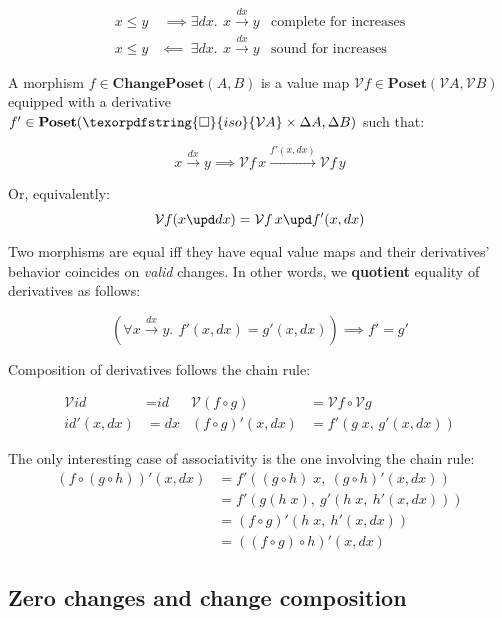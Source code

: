 \documentclass[nomarginums]{rntz}
\newcommand\cat\textbf
\newcommand\strong\textbf
\newcommand\CP{\cat{ChangePoset}}
\newcommand\Poset{\cat{Poset}}
\newcommand\D\Delta
\newcommand\x\times
\newcommand\iso{\texorpdfstring{\ensuremath{\square}}{iso}}
\newcommand\isof[1]{\iso {#1}}
\newcommand\fname[1]{\textit{#1}}
\newcommand\id{\fname{id}}
\newcommand\validarrow{{\to}}
\newcommand\longvalidarrow{{\longrightarrow}}
\newcommand\valid[1]{\mathrel{\overset{#1}{\validarrow}}}
\newcommand\longvalid[1]{\mathrel{\overset{#1}{\longvalidarrow}}}
\newcommand\vals[1]{#1^v} %
\newcommand\chgs[1]{\D{#1}}
\renewcommand\vals{\mathcal{V}}
\newcommand\funct[1]{\vals{#1}}
\newcommand\deriv[1]{#1'}
\newcommand\bindsp{~\,}
\newcommand\fa[1]{\forall #1.\bindsp}
\newcommand\ex[1]{\exists #1.\bindsp}
\begin{document}
\begin{align*}
  x \le y &~\implies \ex{dx} x \valid{dx} y
  & \text{complete for increases}\\
  x \le y &\impliedby~ \ex{dx} x \valid{dx} y
  & \text{sound for increases}
\end{align*}

\noindent
A morphism $f \in \CP(A, B)$ is a value map $\funct f \in \Poset(\vals A, \vals
B)$ eq\-uip\-ped with a derivative $\deriv f \in \Poset(\isof{\vals A} \x \chgs
A, \chgs B)$ such that:

\[ x \valid{dx} y \implies \funct f\,x \longvalid{\deriv f(x,dx)} \funct f\,y\]

\noindent Or, equivalently:
\[ \funct f(x \upd dx) = \funct f\,x \upd \deriv f(x, dx) \]

\noindent
Two morphisms are equal iff they have equal value maps and their derivatives'
behavior coincides on \emph{valid} changes. In other words, we \strong{quotient}
equality of derivatives as follows:

\[ (\fa{x \valid{dx} y} \deriv f(x,dx) = \deriv g(x,dx))
\implies \deriv f = \deriv g \]

\noindent
Composition of derivatives follows the chain rule:

\begin{align*}
  \funct\id &= \id & \funct{(f \circ g)} &= \funct f \circ \funct g\\
  \deriv\id(x,dx) &= dx
  & \deriv{(f \circ g)} (x,dx) &= \deriv f (g \;x,\, \deriv g(x,dx))
\end{align*}

\noindent The only interesting case of associativity is the one involving the
chain rule:
\begin{align*}
  \deriv{(f \circ (g \circ h))} (x,dx)
  &= \deriv f((g \circ h) \;x,\ \deriv{(g \circ h)}(x,dx))\\
  &= \deriv f (g(h \;x),\ \deriv g(h \;x,\ \deriv h(x,dx)))\\
  &= \deriv{(f \circ g)} (h \;x,\ \deriv h(x,dx))\\
  &= \deriv{((f \circ g) \circ h)} (x,dx)
\end{align*}


\subsection{Zero changes and change composition}
\end{document}
